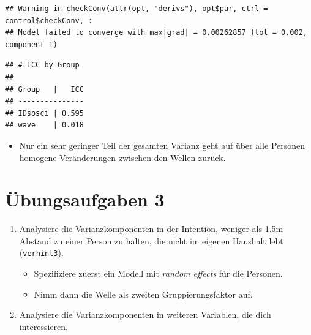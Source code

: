 \documentclass[
]{book}
\newenvironment{Shaded}{\begin{snugshade}}{\end{snugshade}}
\newcommand{\CommentTok}[1]{\textcolor[rgb]{0.56,0.35,0.01}{\textit{#1}}}
\newcommand{\DataTypeTok}[1]{\textcolor[rgb]{0.13,0.29,0.53}{#1}}
\newcommand{\DecValTok}[1]{\textcolor[rgb]{0.00,0.00,0.81}{#1}}
\newcommand{\KeywordTok}[1]{\textcolor[rgb]{0.13,0.29,0.53}{\textbf{#1}}}
\newcommand{\NormalTok}[1]{#1}
\newcommand{\OperatorTok}[1]{\textcolor[rgb]{0.81,0.36,0.00}{\textbf{#1}}}
\newcommand{\OtherTok}[1]{\textcolor[rgb]{0.56,0.35,0.01}{#1}}
\newcommand{\StringTok}[1]{\textcolor[rgb]{0.31,0.60,0.02}{#1}}
\providecommand{\tightlist}{%
  \setlength{\itemsep}{0pt}\setlength{\parskip}{0pt}}
\begin{document}
\begin{Shaded}
\end{Shaded}

\begin{verbatim}
## Warning in checkConv(attr(opt, "derivs"), opt$par, ctrl = control$checkConv, :
## Model failed to converge with max|grad| = 0.00262857 (tol = 0.002, component 1)
\end{verbatim}

\begin{verbatim}
## # ICC by Group
## 
## Group   |   ICC
## ---------------
## IDsosci | 0.595
## wave    | 0.018
\end{verbatim}

\begin{itemize}
\tightlist
\item
  Nur ein sehr geringer Teil der gesamten Varianz geht auf über alle Personen homogene Veränderungen zwischen den Wellen zurück.
\end{itemize}

\hypertarget{uxfcbungsaufgaben-3}{%
\section{Übungsaufgaben 3}\label{uxfcbungsaufgaben-3}}

\begin{enumerate}
\def\labelenumi{\arabic{enumi})}
\tightlist
\item
  Analysiere die Varianzkomponenten in der Intention, weniger als 1.5m Abstand zu einer Person zu halten, die nicht im eigenen Haushalt lebt (\texttt{verhint3}).

  \begin{itemize}
  \tightlist
  \item
    Spezifiziere zuerst ein Modell mit \emph{random effects} für die Personen.
  \item
    Nimm dann die Welle als zweiten Gruppierungsfaktor auf.
  \end{itemize}
\item
  Analysiere die Varianzkomponenten in weiteren Variablen, die dich interessieren.
\end{enumerate}
\end{document}
